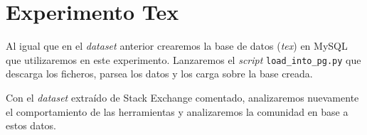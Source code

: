 \documentclass[a4paper, 12pt]{book}
\begin{document}

\clearpage

\section{Experimento Tex}
\label{chap:exper_stack}

Al igual que en el \textit{dataset} anterior crearemos la base de datos (\emph{tex}) en MySQL que utilizaremos en este experimento. Lanzaremos el \emph{script} \texttt{load\_into\_pg.py} que descarga los ficheros, parsea los datos y los carga sobre la base creada.

Con el \textit{dataset} extraído de Stack Exchange comentado, analizaremos nuevamente el comportamiento de las herramientas y analizaremos la comunidad en base a estos datos. 
\end{document}
